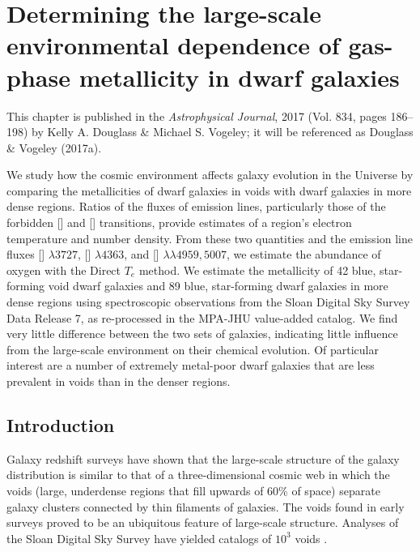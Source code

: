 \chapter[Metallicity of dwarf galaxies]{Determining the large-scale environmental dependence of gas-phase metallicity in dwarf galaxies}\label{ch:Paper1}

This chapter is published in the \emph{Astrophysical Journal}, 2017 (Vol. 834, 
pages 186--198) by Kelly A. Douglass \& Michael S. Vogeley; it will be 
referenced as Douglass \& Vogeley (2017a).


\begin{chapabstract}
We study how the cosmic environment affects galaxy evolution in the Universe by 
comparing the metallicities of dwarf galaxies in voids with dwarf galaxies in 
more dense regions.  Ratios of the fluxes of emission lines, particularly those 
of the forbidden [] and [] transitions, provide estimates of 
a region's electron temperature and number density.  From these two quantities 
and the emission line fluxes [] $\lambda 3727$, [] 
$\lambda 4363$, and [] $\lambda \lambda 4959,5007$, we estimate the 
abundance of oxygen with the Direct $T_e$ method.  We estimate the metallicity 
of 42 blue, star-forming void dwarf galaxies and 89 blue, star-forming dwarf 
galaxies in more dense regions using spectroscopic observations from the Sloan 
Digital Sky Survey Data Release 7, as re-processed in the MPA-JHU value-added 
catalog.  We find very little difference between the two sets of galaxies, 
indicating little influence from the large-scale environment on their chemical 
evolution.  Of particular interest are a number of extremely metal-poor dwarf 
galaxies that are less prevalent in voids than in the denser regions.
\end{chapabstract}


\section{Introduction}


Galaxy redshift surveys have shown that the large-scale structure of the galaxy 
distribution is similar to that of a three-dimensional cosmic web \citep{Bond96} 
in which the voids (large, underdense regions that fill upwards of 60\% of 
space) separate galaxy clusters connected by thin filaments of galaxies.  The 
voids found in early surveys \citep[e.g.,][]{Gregory78, Kirshner81, 
deLapparent86} proved to be an ubiquitous feature of large-scale structure.  
Analyses of the Sloan Digital Sky Survey \citep{Abazajian09, Ahn12} have yielded 
catalogs of $10^3$ voids \citep{Pan12, Sutter14}.

